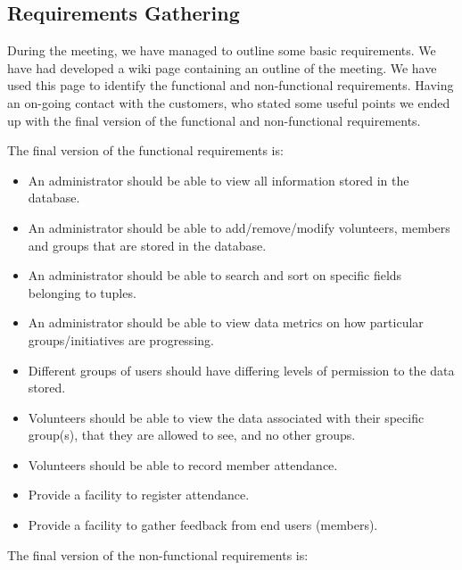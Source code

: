 \documentclass{l3proj}
\begin{document}
\subsection{Requirements Gathering}
\label{requirements}

During the meeting, we have managed to outline some basic requirements. We have had developed a wiki page containing an outline of the meeting. We have used this page to identify the functional and non-functional requirements. Having an on-going contact with the customers, who stated some useful points we ended up with the final version of the functional and non-functional requirements. 

The final version of the functional requirements is:
\begin{itemize}

\item An administrator should be able to view all information stored in the database.

\item An administrator should be able to add/remove/modify volunteers, members and groups that are stored in the database.

\item An administrator should be able to search and sort on specific fields belonging to tuples.

\item An administrator should be able to view data metrics on how particular groups/initiatives are progressing.

\item Different groups of users should have differing levels of permission to the data stored.

\item Volunteers should be able to view the data associated with their specific group(s), that they are allowed to see, and no other groups.

\item Volunteers should be able to record member attendance.

\item Provide a facility to register attendance.

\item Provide a facility to gather feedback from end users (members).

\end{itemize}

The final version of the non-functional requirements is:
\end{document}
